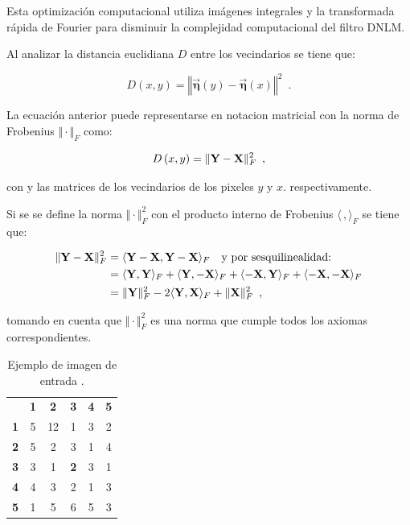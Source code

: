 {Esta optimizaci\'on computacional utiliza im\'agenes integrales y la transformada r\'apida de Fourier para disminuir la complejidad computacional del filtro DNLM. 



Al analizar la distancia euclidiana $D$ entre los vecindarios se tiene que:

\begin{equation}
D\left(x,y\right)=\left\Vert \vec{\boldsymbol{\eta}}\left(y\right)-\vec{\boldsymbol{\eta}}\left(x\right)\right\Vert^2 \enspace . 
\end{equation}

La ecuaci\'on anterior puede representarse en notacion matricial con la norma de Frobenius $\Vert \cdot \Vert_{F}$ como:


\begin{equation}
D\left(x,y\right)=\Vert \mathbf{Y} - \mathbf{X} \Vert_{F}^2 \enspace ,
\label{eq:distMat}
\end{equation}

con  y  las matrices de los vecindarios de los pixeles $y$ y $x$. respectivamente.

Si se se define la norma $\Vert \cdot \Vert_{F}^2$ con el producto interno de Frobenius $\langle\,,\rangle_{F}$ se tiene que:

\begin{equation}\label{eq:frobProd}
\begin{split}
\Vert \mathbf{Y} - \mathbf{X} \Vert_{F}^2 & = \langle\mathbf{Y} - \mathbf{X},\mathbf{Y} - \mathbf{X}\rangle_{F}  \quad \text{y por sesquilinealidad:}\\ 
& = \langle\mathbf{Y},\mathbf{Y}\rangle_{F} + \langle\mathbf{Y},-\mathbf{X}\rangle_{F} + \langle-\mathbf{X},\mathbf{Y}\rangle_{F} + \langle-\mathbf{X},-\mathbf{X}\rangle_{F}\\
& = \Vert \mathbf{Y} \Vert_{F}^2 -2\langle\mathbf{Y},\mathbf{X}\rangle_{F} + \Vert \mathbf{X} \Vert_{F}^2 \enspace ,
\end{split} 
\end{equation}


tomando en cuenta que $\Vert \cdot \Vert_{F}^2$ es una norma que cumple todos los axiomas correspondientes. 

\begin{table}
\begin{center}
\caption{Ejemplo de imagen de entrada .\label{table:imageExample}}

\renewcommand{\arraystretch}{1.4}
\setlength\tabcolsep{3pt}

{
\begin{tabular}{cc|ccc|c}
 & \multicolumn{1}{c}{\textbf{1}} & \textbf{2} & \textbf{3} & \multicolumn{1}{c}{\textbf{4}} & \textbf{5}\tabularnewline
\textbf{1} & \multicolumn{1}{c}{5} & 12 & 1 & \multicolumn{1}{c}{3} & 2\tabularnewline
\cline{3-5} 
\textbf{2} & 5 & 2 & 3 & 1 & 4\tabularnewline
\textbf{3} & 3 & 1 & \textbf{2} & 3 & 1\tabularnewline
\textbf{4} & 4 & 3 & 2 & 1 & 3\tabularnewline
\cline{3-5} 
\textbf{5} & \multicolumn{1}{c}{1} & 5 & 6 & \multicolumn{1}{c}{5} & 3\tabularnewline
\end{tabular}
}
\par\end{center} 
\end{table}

}
